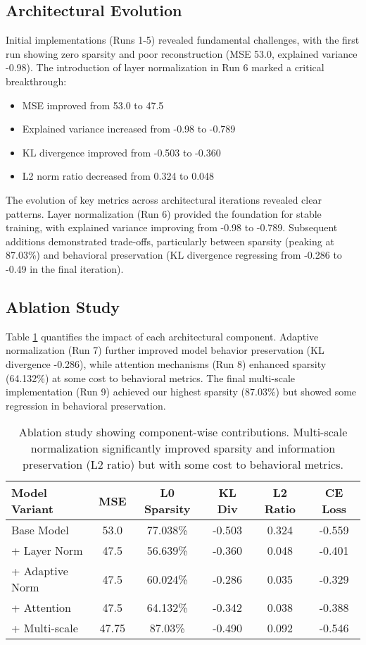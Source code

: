 \documentclass{article} %
\begin{document}
\subsection{Architectural Evolution}
Initial implementations (Runs 1-5) revealed fundamental challenges, with the first run showing zero sparsity and poor reconstruction (MSE 53.0, explained variance -0.98). The introduction of layer normalization in Run 6 marked a critical breakthrough:

\begin{itemize}
\item MSE improved from 53.0 to 47.5
\item Explained variance increased from -0.98 to -0.789
\item KL divergence improved from -0.503 to -0.360
\item L2 norm ratio decreased from 0.324 to 0.048
\end{itemize}

The evolution of key metrics across architectural iterations revealed clear patterns. Layer normalization (Run 6) provided the foundation for stable training, with explained variance improving from -0.98 to -0.789. Subsequent additions demonstrated trade-offs, particularly between sparsity (peaking at 87.03\%) and behavioral preservation (KL divergence regressing from -0.286 to -0.49 in the final iteration).

\subsection{Ablation Study}
Table \ref{tab:ablation} quantifies the impact of each architectural component. Adaptive normalization (Run 7) further improved model behavior preservation (KL divergence -0.286), while attention mechanisms (Run 8) enhanced sparsity (64.132\%) at some cost to behavioral metrics. The final multi-scale implementation (Run 9) achieved our highest sparsity (87.03\%) but showed some regression in behavioral preservation.

\begin{table}[h]
\centering
\begin{tabular}{lccccc}
\toprule
Model Variant & MSE & L0 Sparsity & KL Div & L2 Ratio & CE Loss \\
\midrule
Base Model & 53.0 & 77.038\% & -0.503 & 0.324 & -0.559 \\
+ Layer Norm & 47.5 & 56.639\% & -0.360 & 0.048 & -0.401 \\
+ Adaptive Norm & 47.5 & 60.024\% & -0.286 & 0.035 & -0.329 \\
+ Attention & 47.5 & 64.132\% & -0.342 & 0.038 & -0.388 \\
+ Multi-scale & 47.75 & 87.03\% & -0.490 & 0.092 & -0.546 \\
\bottomrule
\end{tabular}
\caption{Ablation study showing component-wise contributions. Multi-scale normalization significantly improved sparsity and information preservation (L2 ratio) but with some cost to behavioral metrics.}
\label{tab:ablation}
\end{table}
\end{document}
